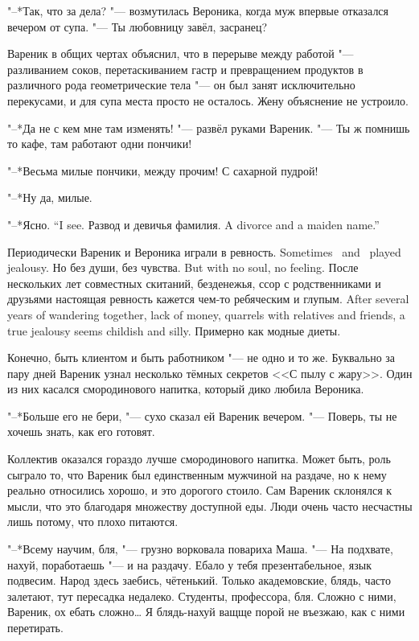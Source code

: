 "--*Так, что за дела? "--- возмутилась Вероника, когда муж впервые отказался вечером от супа.
"--- Ты любовницу завёл, засранец?

Вареник в общих чертах объяснил, что в перерыве между работой "--- разливанием соков, перетаскиванием гастр и превращением продуктов в различного рода геометрические тела "--- он был занят исключительно перекусами, и для супа места просто не осталось.
Жену объяснение не устроило.

"--*Да не с кем мне там изменять! "--- развёл руками Вареник.
"--- Ты ж помнишь то кафе, там работают одни пончики!

"--*Весьма милые пончики, между прочим!
С сахарной пудрой!

"--*Ну да, милые.

{"--*Ясно.}
{``I see.}
{Развод и девичья фамилия.}
{A divorce and a maiden name.''}

{Периодически Вареник и Вероника играли в ревность.}
{Sometimes \Varenik\ and \Veronika\ played jealousy.}
{Но без души, без чувства.}
{But with no soul, no feeling.}
{После нескольких лет совместных скитаний, безденежья, ссор с родственниками и друзьями настоящая ревность кажется чем-то ребяческим и глупым.}
{After several years of wandering together, lack of money, quarrels with relatives and friends, a true jealousy seems childish and silly.}
Примерно как модные диеты.

\asterism

\label{Fri_2012_04_27}

Конечно, быть клиентом и быть работником "--- не одно и то же.
Буквально за пару дней Вареник узнал несколько тёмных секретов <<С пылу с жару>>.
Один из них касался смородинового напитка, который дико любила Вероника.

"--*Больше его не бери, "--- сухо сказал ей Вареник вечером.
"--- Поверь, ты не хочешь знать, как его готовят.

Коллектив оказался гораздо лучше смородинового напитка.
Может быть, роль сыграло то, что Вареник был единственным мужчиной на раздаче, но к нему реально относились хорошо, и это дорогого стоило.
Сам Вареник склонялся к мысли, что это благодаря множеству доступной еды.
Люди очень часто несчастны лишь потому, что плохо питаются.

"--*Всему научим, бля, "--- грузно ворковала повариха Маша.
"--- На подхвате, нахуй, поработаешь "--- и на раздачу.
Ебало у тебя презентабельное, язык подвесим.
Народ здесь заебись, чётенький.
Только академовские, блядь, часто залетают, тут пересадка недалеко.
Студенты, профессора, бля.
Сложно с ними, Вареник, ох ебать сложно\ldots{}
Я блядь-нахуй ващще порой не въезжаю, как с ними перетирать.

